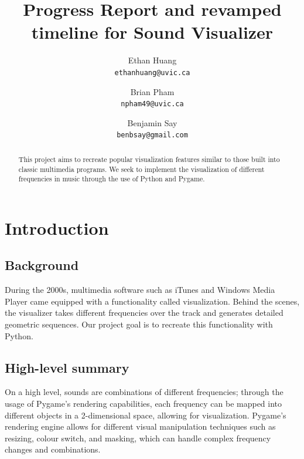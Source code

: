 \documentclass{article}
\title{Progress Report and revamped timeline for Sound Visualizer}
\author{
  Ethan Huang\\
  \texttt{ethanhuang@uvic.ca}
  \and
  Brian Pham\\
  \texttt{npham49@uvic.ca}
  \and
  Benjamin Say\\
  \texttt{benbsay@gmail.com}
}
\begin{document}
\maketitle

\begin{abstract}
This project aims to recreate popular visualization features similar to those built into classic multimedia programs. We seek to implement the visualization of different frequencies in music through the use of Python and Pygame.
\end{abstract}

\section{Introduction}\label{sec:introduction}

\subsection{Background}
During the 2000s, multimedia software such as iTunes and Windows Media Player came equipped with a functionality called visualization. Behind the scenes, the visualizer takes different frequencies over the track and generates detailed geometric sequences. Our project goal is to recreate this functionality with Python. 

\subsection{High-level summary}
On a high level, sounds are combinations of different frequencies; through the usage of Pygame's rendering capabilities, each frequency can be mapped into different objects in a 2-dimensional space, allowing for visualization. Pygame's rendering engine allows for different visual manipulation techniques such as resizing, colour switch, and masking, which can handle complex frequency changes and combinations. 
\end{document}
